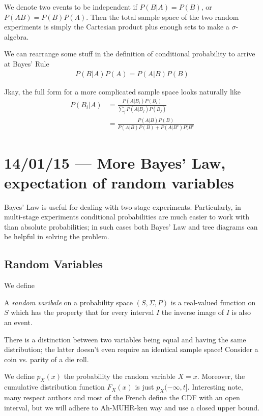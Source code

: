 \documentclass[10pt]{report}
\begin{document}
We denote two events to be independent if $P\left( B|A \right) = P(B)$, or $P(AB) = P(B)P(A)$. Then the total sample space of the two random experiments is simply the Cartesian product plus enough sets to make a $\sigma$-algebra.

We can rearrange some stuff in the definition of conditional probability to arrive at Bayes' Rule
\begin{align}
    P(B|A)P(A) = P(A|B)P(B)
\end{align}

Jkay, the full form for a more complicated sample space looks naturally like
\begin{align}
    P(B_i|A) &= \frac{P(A|B_i)P(B_i)}{\sum\limits_{j}^{}P(A|B_j)P(B_j)}\\
    &= \frac{P(A|B)P(B)}{P(A|B)P(B) + P(A|B^c)P(B^c}
\end{align}

\chapter{14/01/15 --- More Bayes' Law, expectation of random variables}

Bayes' Law is useful for dealing with two-stage experiments. Particularly, in multi-stage experiments conditional probabilities are much easier to work with than absolute probabilities; in such cases both Bayes' Law and tree diagrams can be helpful in solving the problem.

\section{Random Variables}

We define
\begin{center}
    A \emph{random varibale} on a probability space $(S,\Sigma,P)$ is a real-valued function on $S$ which has the property that for every interval $I$ the inverse image of $I$ is also an event. 
\end{center}

There is a distinction between two variables being equal and having the same distribution; the latter doesn't even require an identical sample space! Consider a coin vs. parity of a die roll. 

We define $p_X(x)$ the probability the random variable $X=x$. Moreover, the cumulative distribution function $F_X(x)$ is just $p_X(-\infty,t]$. Interesting note, many respect authors and most of the French define the CDF with an open interval, but we will adhere to Ah-MUHR-ken way and use a closed upper bound.
\end{document}
